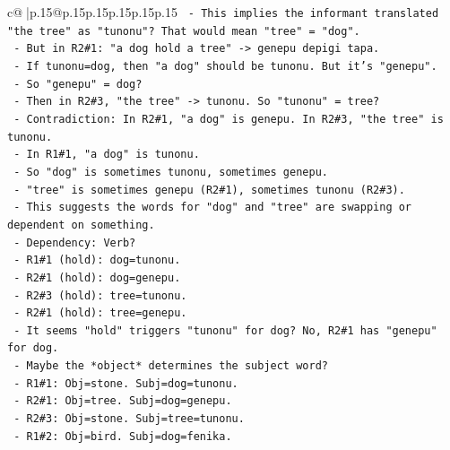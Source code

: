 \documentclass{article}
\begin{document}
{\begin{supertabular}{c@{$\;$}|p{.15\linewidth}@{}p{.15\linewidth}p{.15\linewidth}p{.15\linewidth}p{.15\linewidth}p{.15\linewidth}}
{{{\texttt{                      {-} This implies the informant translated "the tree" as "tunonu"? That would mean "tree" = "dog".} \\
\texttt{                      {-} But in R2\#1: "a dog hold a tree" {-}> genepu depigi tapa.} \\
\texttt{                        {-} If tunonu=dog, then "a dog" should be tunonu. But it's "genepu".} \\
\texttt{                        {-} So "genepu" = dog?} \\
\texttt{                        {-} Then in R2\#3, "the tree" {-}> tunonu. So "tunonu" = tree?} \\
\texttt{                        {-} Contradiction: In R2\#1, "a dog" is genepu. In R2\#3, "the tree" is tunonu.} \\
\texttt{                        {-} In R1\#1, "a dog" is tunonu.} \\
\texttt{                        {-} So "dog" is sometimes tunonu, sometimes genepu.} \\
\texttt{                        {-} "tree" is sometimes genepu (R2\#1), sometimes tunonu (R2\#3).} \\
\texttt{                        {-} This suggests the words for "dog" and "tree" are swapping or dependent on something.} \\
\texttt{                        {-} Dependency: Verb?} \\
\texttt{                          {-} R1\#1 (hold): dog=tunonu.} \\
\texttt{                          {-} R2\#1 (hold): dog=genepu.} \\
\texttt{                          {-} R2\#3 (hold): tree=tunonu.} \\
\texttt{                          {-} R2\#1 (hold): tree=genepu.} \\
\texttt{                          {-} It seems "hold" triggers "tunonu" for dog? No, R2\#1 has "genepu" for dog.} \\
\texttt{                          {-} Maybe the *object* determines the subject word?} \\
\texttt{                            {-} R1\#1: Obj=stone. Subj=dog=tunonu.} \\
\texttt{                            {-} R2\#1: Obj=tree. Subj=dog=genepu.} \\
\texttt{                            {-} R2\#3: Obj=stone. Subj=tree=tunonu.} \\
\texttt{                            {-} R1\#2: Obj=bird. Subj=dog=fenika.} \\
}}}
\end{supertabular}}
\end{document}
